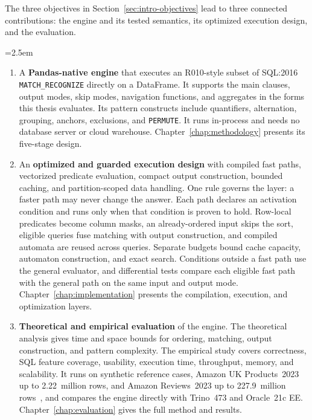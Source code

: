 The three objectives in Section~\ref{sec:intro-objectives} lead to
three connected contributions: the engine and its tested semantics,
its optimized execution design, and the evaluation.

\begingroup\emergencystretch=2.5em
\begin{enumerate}
  \item A \textbf{Pandas-native engine} that executes an R010-style
    subset of SQL:2016 \texttt{MATCH\_RECOGNIZE} directly on a
    DataFrame.  It supports the main clauses, output modes, skip modes,
    navigation functions, and aggregates in the forms this thesis
    evaluates.  Its pattern constructs include quantifiers,
    alternation, grouping, anchors,
    exclusions, and \texttt{PERMUTE}.  It runs in-process and needs no
    database server or cloud warehouse.  Chapter~\ref{chap:methodology}
    presents its five-stage design.

  \item An \textbf{optimized and guarded execution design} with
    compiled fast paths, vectorized predicate evaluation, compact
    output construction, bounded caching, and partition-scoped data
    handling.  One rule governs the layer: a faster path may never
    change the answer.  Each path declares an activation condition and
    runs only when that condition is proven to hold.  Row-local
    predicates become column masks, an already-ordered input skips the
    sort, eligible queries fuse matching with output construction, and
    compiled automata are reused across queries.  Separate budgets
    bound cache capacity, automaton construction, and exact search.
    Conditions outside a fast path use the general evaluator, and
    differential tests compare each eligible fast path with the
    general path on the same input and output mode.
    Chapter~\ref{chap:implementation} presents the compilation,
    execution, and optimization layers.

  \item \textbf{Theoretical and empirical evaluation} of the engine.
    The theoretical analysis gives time and space bounds for ordering,
    matching, output construction, and pattern complexity.  The
    empirical study covers correctness, SQL feature coverage,
    usability, execution time, throughput, memory, and scalability.
    It runs on synthetic reference cases, Amazon UK Products~2023 up
    to 2.22~million rows, and Amazon Reviews~2023 up to
    227.9~million rows~\cite{asaniczka2023amazon,hou2024amazonreviews},
    and compares the engine directly with Trino~473 and Oracle~21c EE.
    Chapter~\ref{chap:evaluation} gives the full method and results.
\end{enumerate}
\endgroup

